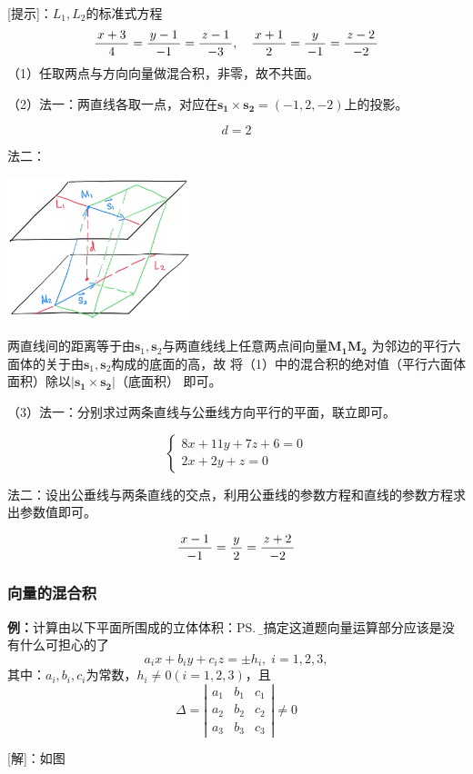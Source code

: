[提示]：$L_1,L_2$的标准式方程
$$\displaystyle\frac{\,{x+3}\,}{\,{4}\,}=\displaystyle\frac{\,{y-1}\,}{\,{-1}\,}=\displaystyle\frac{\,{z-1}\,}{\,{-3}\,},\quad
\displaystyle\frac{\,{x+1}\,}{\,{2}\,}=\displaystyle\frac{\,{y}\,}{\,{-1}\,}=\displaystyle\frac{\,{z-2}\,}{\,{-2}\,}$$
（1）任取两点与方向向量做混合积，非零，故不共面。

（2）法一：两直线各取一点，对应在$\bm{s_1}\times\bm{s_2}=(-1,2,-2)$上的投影。

$$d=2$$

法二：
\begin{center}
	\includegraphics[width=0.4\textwidth]{./images/ch8/lln.jpg}
\end{center}
两直线间的距离等于由$\bm{s}_1,\bm{s}_2$与两直线线上任意两点间向量$\bm{M_1M_2}$
为邻边的平行六面体的关于由$\bm{s}_1,\bm{s}_2$构成的底面的高，故
将（1）中的混合积的绝对值（平行六面体面积）除以$|\bm{s_1}\times\bm{s_2}|$（底面积）
即可。

（3）法一：分别求过两条直线与公垂线方向平行的平面，联立即可。

$$\left\{\begin{array}{l}
	8x+11y+7z+6=0\\
	2x+2y+z=0
\end{array}\right.$$

法二：设出公垂线与两条直线的交点，利用公垂线的参数方程和直线的参数方程求出参数值即可。

$$\displaystyle\frac{\,{x-1}\,}{\,{-1}\,}=\displaystyle\frac{\,{y}\,}{\,{2}\,}=\displaystyle\frac{\,{z+2}\,}{\,{-2}\,}$$

\subsubsection{向量的混合积}

{\bf 例：}计算由以下平面所围成的立体体积：\ps{\b 能搞定这道题向量运算部分应该是没有什么可担心的了}
$$a_ix+b_iy+c_iz=\pm h_i,\;i=1,2,3,$$
其中：$a_i,b_i,c_i$为常数，$h_i\ne0(i=1,2,3)$，且
$$\Delta=\left|\begin{array}{ccc}
a_1 & b_1 & c_1\\ a_2 & b_2 & c_2 \\ a_3 & b_3 & c_3
\end{array}\right|\ne 0$$

[解]：如图

